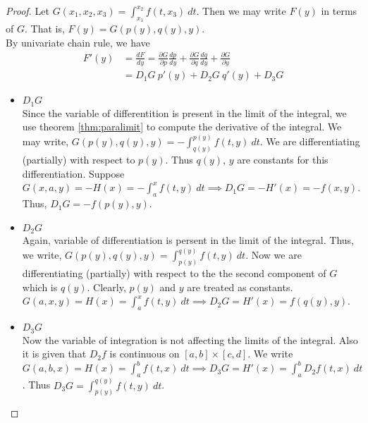 \begin{proof}
	Let $G(x_1,x_2,x_3) = \int_{x_1}^{x_2} f(t,x_3)\ dt$. Then we may write $F(y)$ in terms of $G$. That is, $F(y) = G(p(y),q(y),y)$.\\

	By univariate chain rule, we have 
	\begin{align*}
		F'(y) & = \frac{dF}{dy} = \frac{\partial G}{\partial p} \frac{dp}{dy} + \frac{\partial G}{\partial q} \frac{dq}{dy} + \frac{\partial G}{\partial y} \\
		& = D_1 G\ p'(y) + D_2 G\ q'(y) + D_3 G
	\end{align*}

	\begin{itemize}
		\item $D_1 G$ \\
			Since the variable of differentition is present in the limit of the integral, we use theorem \ref{thm:paralimit} to compute the derivative of the integral. We may write, $G(p(y),q(y),y)  = -\int_{q(y)}^{p(y)} f(t,y)\ dt$. We are differentiating (partially) with respect to $p(y)$. Thus $q(y)$, $y$ are constants for this differentiation. Suppose $G(x,a,y) = -H(x) = -\int_a^x f(t,y)\ dt \implies D_1 G = -H'(x)= -f(x,y)$. Thus, $D_1 G = -f(p(y),y)$.
		\item $D_2 G$ \\
			Again, variable of differentiation is persent in the limit of the integral. Thus, we write, $G(p(y),q(y),y) = \int_{p(y)}^{q(y)} f(t,y)\ dt$. Now we are differentiating (partially) with respect to the the second component of $G$ which is $q(y)$. Clearly, $p(y)$ and $y$ are treated as constants. $G(a,x,y) = H(x) = \int_a^x f(t,y)\ dt \implies D_2 G = H'(x) = f(q(y),y)$.
		\item $D_3 G$ \\
			Now the variable of integration is not affecting the limits of the integral. Also it is given that $D_2 f$ is continuous on $[a,b] \times [c,d]$. We write $G(a,b,x) = H(x) = \int_a^b f(t,x)\ dt \implies D_3 G = H'(x) = \int_a^b D_2 f(t,x)\ dt$. Thus $D_3 G = \int_{p(y)}^{q(y)} f(t,y)\ dt$.
	\end{itemize}
\end{proof}

